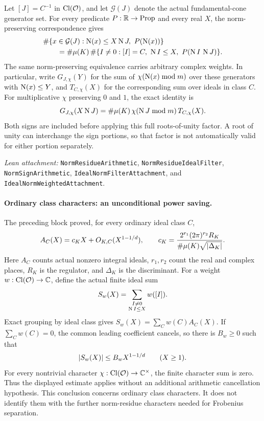 Let $[J]=C^{-1}$ in $\operatorname{Cl}(\mathcal O)$, and let $\mathcal G(J)$ denote the
actual fundamental-cone generator set. For every predicate $P:\mathbb R\to\mathrm{Prop}$
and every real $X$, the norm-preserving correspondence gives
\begin{align*}
 &\#\{x\in\mathcal G(J):\operatorname N(x)\leq X\operatorname N J,\ P(\operatorname N(x))\}\\
 &\qquad=\#\mu(K)\,
 \#\{I\ne0:[I]=C,\ \operatorname N I\leq X,\ P(\operatorname N I\,\operatorname N J)\}.
\end{align*}
The same norm-preserving equivalence carries arbitrary complex weights.
In particular, write $G_{J,\chi}(Y)$ for the sum of
$\chi(\operatorname N(x)\bmod m)$ over these generators with $\operatorname N(x)\leq Y$, and
$T_{C,\chi}(X)$ for the corresponding sum over ideals in class $C$.
For multiplicative $\chi$ preserving $0$ and $1$, the exact identity is
\begin{equation}\label{eq:weighted-torsion}
 G_{J,\chi}(X\operatorname N J)
 =\#\mu(K)\,\chi(\operatorname N J\bmod m)\,T_{C,\chi}(X).
\end{equation}
Both signs are included before applying this full roots-of-unity factor.
A root of unity can interchange the sign portions, so that factor is not
automatically valid for either portion separately.

\smallskip
\noindent\emph{Lean attachment:}
\nolinkurl{NormResidueArithmetic}, \nolinkurl{NormResidueIdealFilter},
\nolinkurl{NormSignArithmetic}, \nolinkurl{IdealNormFilterAttachment}, and
\nolinkurl{IdealNormWeightedAttachment}.

\newpage
\paragraph{Ordinary class characters: an unconditional power saving.}
The preceding block proved, for every ordinary ideal class $C$,
\[
 A_C(X)=c_KX+O_{K,C}(X^{1-1/d}),\qquad
 c_K=\frac{2^{r_1}(2\pi)^{r_2}R_K}{\#\mu(K)\sqrt{\lvert \Delta_K\rvert}}.
\]
Here $A_C$ counts actual nonzero integral ideals, $r_1,r_2$ count the real
and complex places, $R_K$ is the regulator, and $\Delta_K$ is the discriminant. For a weight
$w:\operatorname{Cl}(\mathcal O)\to\mathbb C$, define the actual finite ideal sum
\[
 S_w(X)=\sum_{\substack{I\ne0\\\operatorname N I\leq X}}w([I]).
\]
Exact grouping by ideal class gives $S_w(X)=\sum_C w(C)A_C(X)$.
If $\sum_Cw(C)=0$, the common leading coefficient cancels, so there is
$B_w\geq0$ such that
\[
 \lvert S_w(X)\rvert\leq B_wX^{1-1/d}\qquad(X\geq1).
\]
For every nontrivial character $\chi:\operatorname{Cl}(\mathcal O)\to\mathbb C^{\times}$,
the finite character sum is zero. Thus the displayed estimate applies
without an additional arithmetic cancellation hypothesis.
This conclusion concerns ordinary class characters. It does not identify
them with the further norm-residue characters needed for Frobenius separation.

